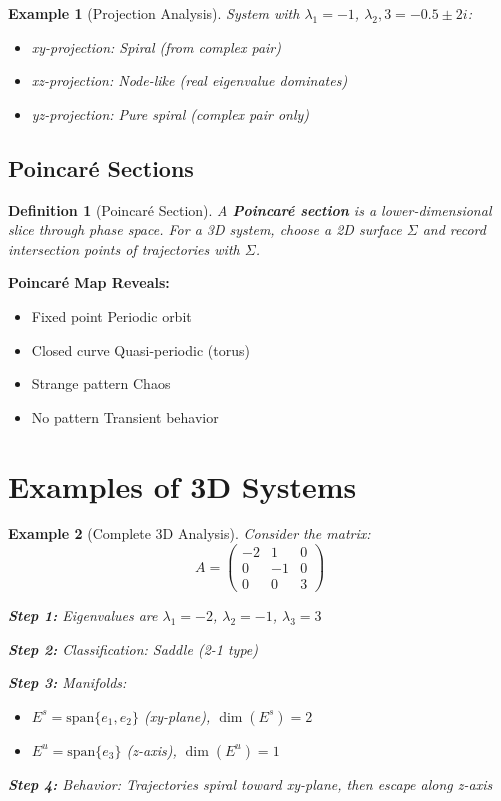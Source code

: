 \documentclass[12pt]{article}
\newtheorem{definition}{Definition}
\newtheorem{example}{Example}
\begin{document}
\begin{example}[Projection Analysis]
System with $\lambda_{1} = -1$, $\lambda_{2},3 = -0.5 \pm 2i$:
\begin{itemize}
    \item xy-projection: Spiral (from complex pair)
    \item xz-projection: Node-like (real eigenvalue dominates)
    \item yz-projection: Pure spiral (complex pair only)
\end{itemize}
\end{example}

\subsection{Poincaré Sections}

\begin{definition}[Poincaré Section]
A \textbf{Poincaré section} is a lower-dimensional slice through phase space. For a 3D system, choose a 2D surface $\Sigma$ and record intersection points of trajectories with $\Sigma$.
\end{definition}

\begin{insight}
\textbf{Poincaré Map Reveals:}
\begin{itemize}
    \item Fixed point \rightarrow Periodic orbit
    \item Closed curve \rightarrow Quasi-periodic (torus)
    \item Strange pattern \rightarrow Chaos
    \item No pattern \rightarrow Transient behavior
\end{itemize}
\end{insight}

\section{Examples of 3D Systems}

\begin{example}[Complete 3D Analysis]
Consider the matrix:
$$A = \begin{pmatrix} -2 & 1 & 0 \\ 0 & -1 & 0 \\ 0 & 0 & 3 \end{pmatrix}$$

\textbf{Step 1:} Eigenvalues are $\lambda_{1} = -2$, $\lambda_{2} = -1$, $\lambda_{3} = 3$

\textbf{Step 2:} Classification: Saddle (2-1 type)

\textbf{Step 3:} Manifolds:
\begin{itemize}
    \item $E^{s} = \text{span}\{e_{1}, e_{2}\}$ (xy-plane), $\dim(E^{s}) = 2$
    \item $E^{u} = \text{span}\{e_{3}\}$ (z-axis), $\dim(E^{u}) = 1$
\end{itemize}

\textbf{Step 4:} Behavior: Trajectories spiral toward xy-plane, then escape along z-axis
\end{example}
\end{document}
